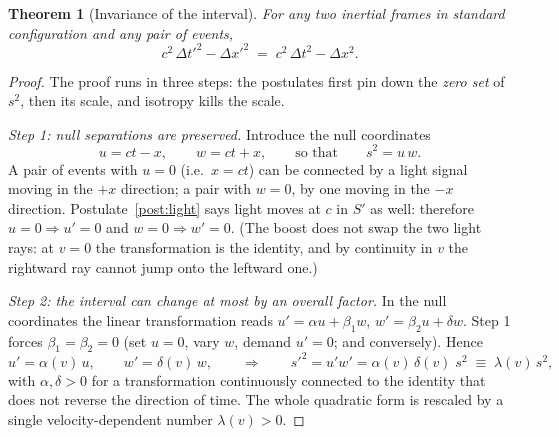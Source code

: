 \documentclass[11pt]{article}
\theoremstyle{plain}
\newtheorem{theorem}{Theorem}[section]
\theoremstyle{definition}
\theoremstyle{remark}
\begin{document}
\begin{theorem}[Invariance of the interval]\label{thm:interval}
For any two inertial frames in standard configuration and any pair of
events,
\begin{equation}
  \boxed{\;
  c^2\,\Delta t'^2 - \Delta x'^2 \;=\; c^2\,\Delta t^2 - \Delta x^2 .
  \;}
  \label{eq:interval-invariance}
\end{equation}
\end{theorem}

\begin{proof}
The proof runs in three steps: the postulates first pin down the
\emph{zero set} of $s^2$, then its scale, and isotropy kills the scale.

\emph{Step 1: null separations are preserved.} Introduce the null
coordinates
\begin{equation}
  u = ct - x, \qquad w = ct + x,
  \qquad\text{so that}\qquad
  s^2 = u\,w .
  \label{eq:null-coords}
\end{equation}
A pair of events with $u = 0$ (i.e.\ $x = ct$) can be connected by a
light signal moving in the $+x$ direction; a pair with $w = 0$, by one
moving in the $-x$ direction. Postulate~\ref{post:light} says light moves
at $c$ in $S'$ as well: therefore $u = 0 \Rightarrow u' = 0$ and
$w = 0 \Rightarrow w' = 0$. (The boost does not swap the two light rays:
at $v = 0$ the transformation is the identity, and by continuity in $v$
the rightward ray cannot jump onto the leftward one.)

\emph{Step 2: the interval can change at most by an overall factor.}
In the null coordinates the linear transformation reads
$u' = \alpha u + \beta_1 w$, $w' = \beta_2 u + \delta w$. Step 1 forces
$\beta_1 = \beta_2 = 0$ (set $u=0$, vary $w$, demand $u'=0$; and
conversely). Hence
\begin{equation}
  u' = \alpha(v)\, u, \qquad w' = \delta(v)\, w,
  \qquad\Longrightarrow\qquad
  s'^2 = u'w' = \alpha(v)\,\delta(v)\; s^2
  \;\equiv\; \lambda(v)\, s^2 ,
  \label{eq:scale-factor}
\end{equation}
with $\alpha, \delta > 0$ for a transformation continuously connected to
the identity that does not reverse the direction of time. The whole
quadratic form is rescaled by a single velocity-dependent number
$\lambda(v) > 0$.


\end{proof}
\end{document}
